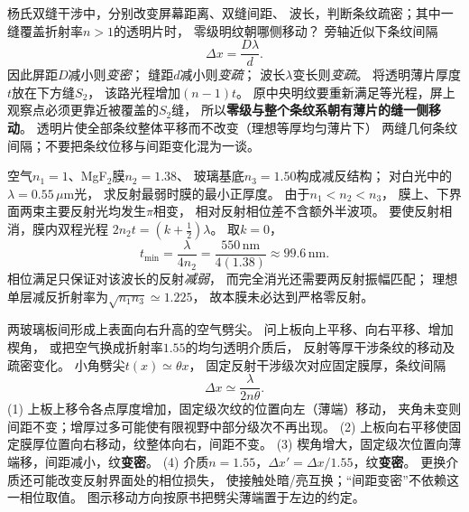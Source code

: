 

\problemtext 杨氏双缝干涉中，分别改变屏幕距离、双缝间距、
波长，判断条纹疏密；其中一缝覆盖折射率$n>1$的透明片时，
零级明纹朝哪侧移动？
\workings
旁轴近似下条纹间隔
\[
\boxed{\Delta x=\frac{D\lambda}{d}}.
\]
因此屏距$D$减小则\emph{变密}；
缝距$d$减小则\emph{变疏}；
波长$\lambda$变长则\emph{变疏}。
将透明薄片厚度$t$放在下方缝$S_2$，
该路光程增加$(n-1)t$。
原中央明纹要重新满足等光程，屏上观察点必须更靠近被覆盖的$S_2$缝，
所以\textbf{零级与整个条纹系朝有薄片的缝一侧移动}。
\crosscheck 透明片使全部条纹整体平移而不改变（理想等厚均匀薄片下）
两缝几何条纹间隔；不要把条纹位移与间距变化混为一谈。

\problemtext 空气$n_1=1$、MgF$_2$膜$n_2=1.38$、
玻璃基底$n_3=1.50$构成减反结构；
对白光中的$\lambda=0.55\,\mu$m光，
求反射最弱时膜的最小正厚度。
\workings
由于$n_1<n_2<n_3$，
膜上、下界面两束主要反射光均发生$\pi$相变，
相对反射相位差不含额外半波项。
要使反射相消，膜内双程光程
$2n_2t=(k+\tfrac12)\lambda$。
取$k=0$，
\[
\boxed{t_{\min}=\frac{\lambda}{4n_2}
=\frac{550\,\mathrm{nm}}{4(1.38)}
\approx99.6\,\mathrm{nm}}.
\]
\crosscheck 相位满足只保证对该波长的反射\emph{减弱}，
而完全消光还需要两反射振幅匹配；
理想单层减反折射率为$\sqrt{n_1n_3}\simeq1.225$，
故本膜未必达到严格零反射。

\problemtext 两玻璃板间形成上表面向右升高的空气劈尖。
问上板向上平移、向右平移、增加楔角，
或把空气换成折射率$1.55$的均匀透明介质后，
反射等厚干涉条纹的移动及疏密变化。
\workings
小角劈尖$t(x)\simeq\theta x$，
固定反射干涉级次对应固定膜厚，条纹间隔
\[
\boxed{\Delta x\simeq\frac{\lambda}{2n\theta}}.
\]
(1) 上板上移令各点厚度增加，固定级次纹的位置向左（薄端）移动，
夹角未变则间距不变；增厚过多可能使有限视野中部分级次不再出现。
(2) 上板向右平移使固定膜厚位置向右移动，纹整体向右，间距不变。
(3) 楔角增大，固定级次位置向薄端移，间距减小，纹\textbf{变密}。
(4) 介质$n=1.55$，$\Delta x'=\Delta x/1.55$，纹\textbf{变密}。
\crosscheck 更换介质还可能改变反射界面处的相位损失，
使接触处暗/亮互换；“间距变密”不依赖这一相位取值。
图示移动方向按原书把劈尖薄端置于左边的约定。

